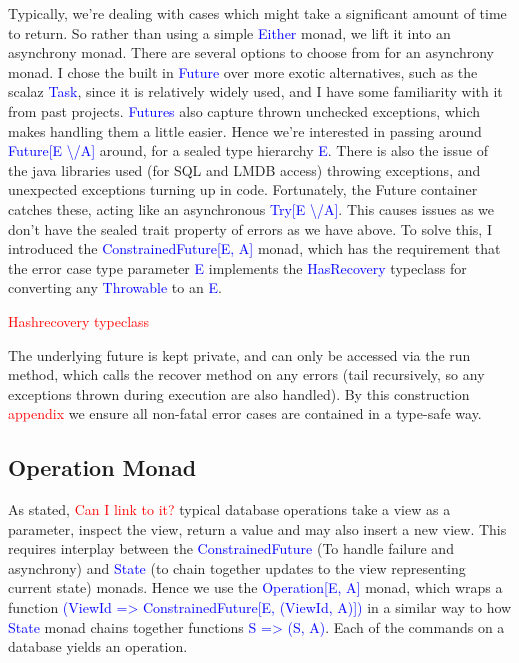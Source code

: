 \documentclass[12pt,a4paper,twoside,openright]{report}
\newcommand\todo[1]{\textcolor{red}{#1}}
\newcommand\codeName[1]{\textcolor{blue}{#1}}
\newcommand\either[0]{\textbackslash/}
\begin{document}
Typically, we’re dealing with cases which might take a significant amount of time to return. So rather than using a simple \codeName{Either} monad, we lift it into an asynchrony monad. There are several options to choose from for an asynchrony monad. I chose the built in \codeName{Future} over more exotic alternatives, such as the scalaz \codeName{Task}, since it is relatively widely used, and I have some familiarity with it from past projects. \codeName{Futures} also capture thrown unchecked exceptions, which makes handling them a little easier. Hence we’re interested in passing around \codeName{Future[E \either A]} around, for a sealed type hierarchy \codeName{E}. There is also the issue of the java libraries used (for SQL and LMDB access) throwing exceptions, and unexpected exceptions turning up in code. Fortunately, the  Future container catches these, acting like an asynchronous \codeName{Try[E \either A]}. This causes issues as we don’t have the sealed trait property of errors as we have above. To solve this, I introduced the \codeName{ConstrainedFuture[E, A]} monad, which has the requirement that the error case type parameter \codeName{E} implements the \codeName{HasRecovery} typeclass for converting any \codeName{Throwable} to an \codeName{E}.

\todo{Hashrecovery typeclass}

The underlying future is kept private, and can only be accessed via the run method, which calls the recover method on any errors (tail recursively, so any exceptions thrown during execution are also handled). By this construction \todo{appendix} we ensure all non-fatal error cases are contained in a type-safe way.

	\subsection{Operation Monad}
	As stated, \todo{Can I link to it?} typical database operations take a view as a parameter, inspect the view, return a value and may also insert a new view. This requires interplay between the \codeName{ConstrainedFuture} (To handle failure and asynchrony) and \codeName{State} (to chain together updates to the view representing current state) monads. Hence we use the \codeName{Operation[E, A]} monad, which wraps a function \codeName{(ViewId => ConstrainedFuture[E, (ViewId, A)])} in a similar way to how \codeName{State} monad chains together functions \codeName{S => (S, A)}. Each of the commands on a database yields an operation.
\end{document}

